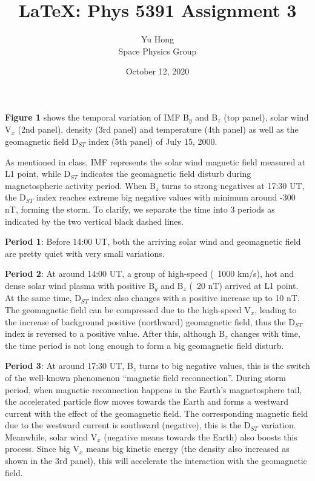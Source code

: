 \documentclass[12pt, letterpaper]{article} %
\begin{document}
\title{\LaTeX: Phys 5391 Assignment 3} %
\author{Yu Hong\\Space Physics Group} %
\date{October 12, 2020}  %
\maketitle %


\graphicspath{ {./images/} } %
\textbf{Figure 1} shows the temporal variation of IMF B$_y$ and B$_z$ (top panel), solar wind V$_x$ (2nd panel), density (3rd panel) and temperature (4th panel) as well as the geomagnetic field D$_{ST}$ index (5th panel) of July 15, 2000.

As mentioned in class, IMF represents the solar wind magnetic field measured at L1 point, while D$_{ST}$  indicates the geomagnetic field disturb during magnetospheric activity period. When B$_z$ turns to strong negatives at 17:30 UT, the D$_{ST}$  index reaches extreme big negative values with minimum around -300 nT, forming the storm. To clarify, we separate the time into 3 periods as indicated by the two vertical black dashed lines. 

\textbf{Period 1}: Before 14:00 UT, both the arriving solar wind and geomagnetic field are pretty quiet with very small variations. 

\textbf{Period 2}: At around 14:00 UT, a group of high-speed (~1000 km/s), hot and dense solar wind plasma with positive B$_y$ and B$_z$ (~20 nT) arrived at L1 point. At the same time, D$_{ST}$  index also changes with a positive increase up to 10 nT. The geomagnetic field can be compressed due to the high-speed V$_x$, leading to the increase of background positive (northward) geomagnetic field, thus the D$_{ST}$  index is reversed to a positive value. After this, although B$_z$ changes with time, the time period is not long enough to form a big geomagnetic field disturb.

\textbf{Period 3}: At around 17:30 UT, B$_z$ turns to big negative values, this is the switch of the well-known phenomenon “magnetic field reconnection”. During storm period, when magnetic reconnection happens in the Earth’s magnetosphere tail, the accelerated particle flow moves towards the Earth and forms a westward current with the effect of the geomagnetic field. The corresponding magnetic field due to the westward current is southward (negative), this is the D$_{ST}$  variation. Meanwhile, solar wind V$_x$ (negative means towards the Earth) also boosts this process. Since big V$_x$ means big kinetic energy (the density also increased as shown in the 3rd panel), this will accelerate the interaction with the geomagnetic field. 
\end{document}
